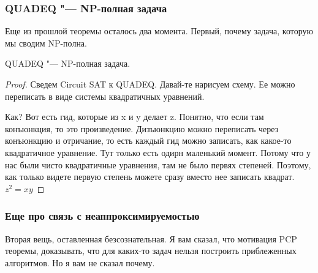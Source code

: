 ﻿\subsubsection{QUADEQ "--- NP-полная задача}
Еще из прошлой теоремы осталось два момента. 
Первый, почему задача, которую мы сводим NP-полна.

\begin{lemma}
	QUADEQ "--- NP-полная задача.
\end{lemma}
\begin{proof}
	Сведем Circuit SAT к QUADEQ. Давай-те нарисуем схему. Ее можно переписать
	в виде системы квадратичных уравнений.

	Как? Вот есть гид, которые из x и y делает z. Понятно, что если там конъюнкция, 
	то это произведение. Дизъюнкцию можно переписать через конъюнкцию и отричание, 
	то есть каждый гид можно записать, как какое-то квадратичное уравнение. Тут только
	есть одирн маленький момент. Потому что у нас были чисто квадратичные уравнения, там
	не было первях степеней. Поэтому, как только видете первую степень можете сразу вместо 
	нее записать квадрат. $z^2 = xy$
\end{proof}

\subsubsection{Еще про связь с неаппроксимируемостью}

Вторая вещь, оставленная безсознательная. Я вам сказал, что мотивация PCP теоремы, 
доказывать, что для каких-то задач нельзя построить приблеженных алгоритмов. Но я вам не сказал почему. 

